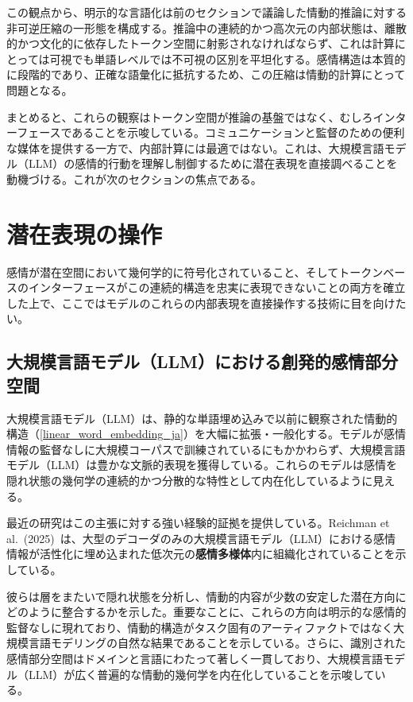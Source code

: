 この観点から、明示的な言語化は前のセクションで議論した情動的推論に対する非可逆圧縮の一形態を構成する。推論中の連続的かつ高次元の内部状態は、離散的かつ文化的に依存したトークン空間に射影されなければならず、これは計算にとっては可視でも単語レベルでは不可視の区別を平坦化する。感情構造は本質的に段階的であり、正確な語彙化に抵抗するため、この圧縮は情動的計算にとって問題となる。

まとめると、これらの観察はトークン空間が推論の基盤ではなく、むしろインターフェースであることを示唆している。コミュニケーションと監督のための便利な媒体を提供する一方で、内部計算には最適ではない。これは、大規模言語モデル（LLM）の感情的行動を理解し制御するために潜在表現を直接調べることを動機づける。これが次のセクションの焦点である。

\section{潜在表現の操作}

感情が潜在空間において幾何学的に符号化されていること、そしてトークンベースのインターフェースがこの連続的構造を忠実に表現できないことの両方を確立した上で、ここではモデルのこれらの内部表現を直接操作する技術に目を向けたい。

\subsection{大規模言語モデル（LLM）における創発的感情部分空間}

大規模言語モデル（LLM）は、静的な単語埋め込みで以前に観察された情動的構造（\ref{linear_word_embedding_ja}）を大幅に拡張・一般化する。モデルが感情情報の監督なしに大規模コーパスで訓練されているにもかかわらず、大規模言語モデル（LLM）は豊かな文脈的表現を獲得している。これらのモデルは感情を隠れ状態の幾何学の連続的かつ分散的な特性として内在化しているように見える。

最近の研究はこの主張に対する強い経験的証拠を提供している。Reichman et al.\ (2025)~\cite{reichman2025emotionsartthouunderstanding}は、大型のデコーダのみの大規模言語モデル（LLM）における感情情報が活性化に埋め込まれた低次元の\textbf{感情多様体}内に組織化されていることを示している。

彼らは層をまたいで隠れ状態を分析し、情動的内容が少数の安定した潜在方向にどのように整合するかを示した。重要なことに、これらの方向は明示的な感情的監督なしに現れており、情動的構造がタスク固有のアーティファクトではなく大規模言語モデリングの自然な結果であることを示している。さらに、識別された感情部分空間はドメインと言語にわたって著しく一貫しており、大規模言語モデル（LLM）が広く普遍的な情動的幾何学を内在化していることを示唆している。

